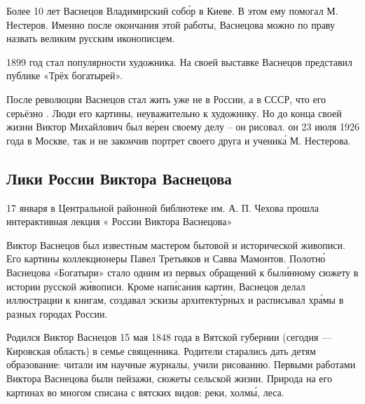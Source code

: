 Более 10 лет Васнецов  Владимирский соб\'{о}р в Киеве. В этом ему помогал М. Нестеров. Именно после окончания этой работы, Васнецова можно по праву назвать великим русским иконописцем.

1899 год стал  популярности художника. На своей выставке Васнецов представил публике «Трёх богатырей».

После революции Васнецов стал жить уже не в России, а в СССР, что его серьёзно . Люди  его картины,  неуважительно к художнику. Но до конца своей жизни Виктор Михайлович был в\'{е}рен своему делу -- он рисовал.  он 23 июля 1926 года в Москве, так и не закончив портрет своего друга и ученик\'{а} М. Нестерова.



\subsection{Лики России Виктора Васнецова}

17 января в Центральной районной библиотеке им. А. П. Чехова прошла интерактивная лекция « России Виктора Васнецова»

Виктор Васнецов был известным мастером бытовой и исторической живописи. Его картины  коллекционеры Павел Третьяков и Савва Мамонтов. Полотн\'{о} Васнецова «Богатыри» стало одним из первых обращений к был\'{и}нному сюжету в истории русской ж\'{и}вописи. Кроме нап\'{и}сания картин, Васнецов делал иллюстрации к книгам, создавал эскизы архитект\'{у}рных  и расписывал хр\'{а}мы в разных городах России.

Родился Виктор Васнецов 15 мая 1848 года в Вятской губернии (сегодня --- Кировская область) в семье священника. Родители старались дать детям  образование: читали им научные журналы, учили рисованию. Первыми работами Виктора Васнецова были пейзажи, сюжеты сельской жизни. Природа на его картинах во многом списана с вятских видов:  реки, холм\'{ы},   леса.

